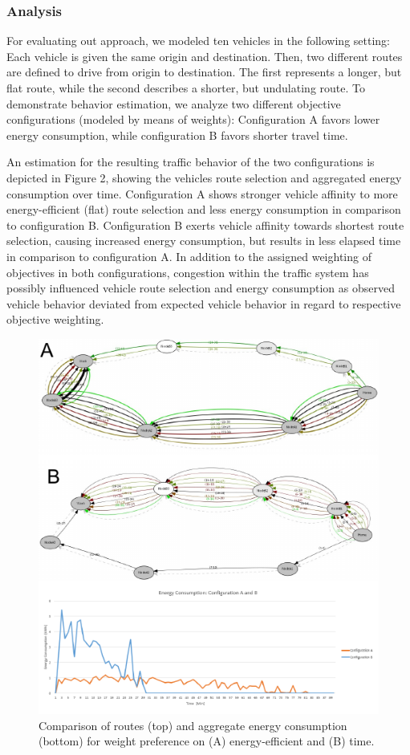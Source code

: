 \documentclass[conference]{../cls/IEEEtran}
\begin{document}
\subsubsection*{Analysis}

For evaluating out approach, we modeled ten vehicles in the following setting: Each vehicle is given the same origin and destination. Then, two different routes are defined to drive from origin to destination. The first represents a longer, but flat route, while the second describes a shorter, but undulating route. To demonstrate behavior estimation, we analyze two different objective configurations (modeled by means of weights): Configuration A favors lower energy consumption, while configuration B favors shorter travel time.

An estimation for the resulting traffic behavior of the two
configurations is depicted in Figure 2, showing the vehicles route selection
and aggregated energy consumption over time. Configuration A shows
stronger vehicle affinity to more energy-efficient (flat) route selection and
less energy consumption in comparison to configuration B. Configuration B exerts
vehicle affinity towards shortest route selection, causing increased energy
consumption, but results in less elapsed time in comparison to configuration A.
In addition to the assigned weighting of objectives in both configurations,
congestion within the traffic system has possibly influenced vehicle
route selection and energy consumption as observed vehicle behavior deviated
from expected vehicle behavior in regard to respective objective weighting.

\begin{figure}[t!]
	\includegraphics[width=\columnwidth]{../gfx/results.pdf}
	\caption{Comparison of routes (top) and aggregate energy consumption
	(bottom) for weight preference  on (A) energy-efficient and (B) time.}
	\label{figure:results}
\end{figure}
\end{document}
